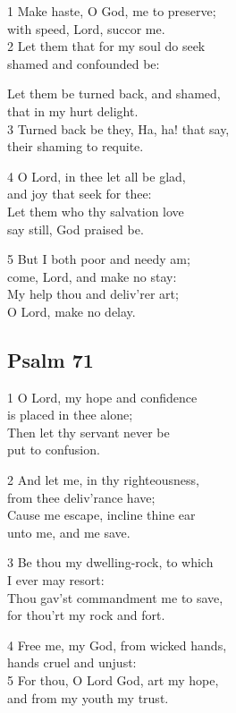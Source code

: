 \begin{multicols}{3}
1 Make haste, O God, me to preserve;\\
with speed, Lord, succor me.\\
2 Let them that for my soul do seek\\
shamed and confounded be:

Let them be turned back, and shamed,\\
that in my hurt delight.\\
3 Turned back be they, Ha, ha! that say,\\
their shaming to requite.

4 O Lord, in thee let all be glad,\\
and joy that seek for thee:\\
Let them who thy salvation love\\
say still, God praised be.

5 But I both poor and needy am;\\
come, Lord, and make no stay:\\
My help thou and deliv’rer art;\\
O Lord, make no delay.

\begin{center}
\quad{}\quad{}
\end{center}
\subsection*{Psalm 71}

1 O Lord, my hope and confidence\\
is placed in thee alone;\\
Then let thy servant never be\\
put to confusion.

2 And let me, in thy righteousness,\\
from thee deliv’rance have;\\
Cause me escape, incline thine ear\\
unto me, and me save.

3 Be thou my dwelling-rock, to which\\
I ever may resort:\\
Thou gav’st commandment me to save,\\
for thou’rt my rock and fort.

4 Free me, my God, from wicked hands,\\
hands cruel and unjust:\\
5 For thou, O Lord God, art my hope,\\
and from my youth my trust.


\end{multicols}
